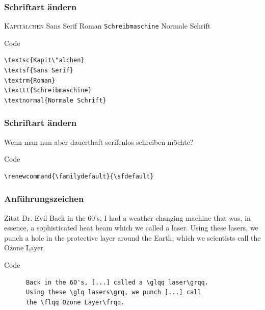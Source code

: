 \begin{frame}[fragile]
  \frametitle{Schriftart ändern}

  \begin{example}
    \textsc{Kapit\"alchen}
    \textsf{Sans Serif}
    \textrm{Roman}
    \texttt{Schreibmaschine}
    \textnormal{Normale Schrift} 
  \end{example}
  \pause
  \begin{block}{Code}
    \begin{verbatim}
\textsc{Kapit\"alchen}
\textsf{Sans Serif}
\textrm{Roman}
\texttt{Schreibmaschine}
\textnormal{Normale Schrift} 
    \end{verbatim}
  \end{block}
\end{frame}
\begin{frame}[fragile]
  \frametitle{Schriftart ändern}

  Wenn man nun aber dauerthaft serifenlos schreiben möchte?

  \pause
  \begin{block}{Code}
    \begin{verbatim}
\renewcommand{\familydefault}{\sfdefault}
    \end{verbatim}
  \end{block}
\end{frame}

\begin{frame}[fragile]
  \frametitle{Anführungszeichen}

  \pause
  \begin{block}{Zitat Dr. Evil}
    Back in the 60's, I had a weather changing machine that was, in essence, a sophisticated heat beam which we called a \glqq laser\grqq. Using these \glq lasers\grq, we punch a hole in the protective layer around the Earth, which we scientists call the \flqq Ozone Layer\frqq.
  \end{block}
  \pause
  \begin{block}{Code}
    \begin{verbatim}
      Back in the 60's, [...] called a \glqq laser\grqq. 
      Using these \glq lasers\grq, we punch [...] call 
      the \flqq Ozone Layer\frqq.
    \end{verbatim}
  \end{block}
\end{frame}

